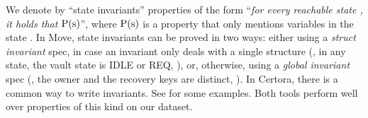  
 We denote by ``state invariants'' properties of the form ``\emph{for every reachable state \state, it holds that $\Prop(\state)$}'', where {$\Prop(\state)$} is a property that only mentions variables in the state \state. 
In Move,  state invariants can be proved in two ways: either using a \emph{struct invariant} spec, in case an invariant only deals with a single structure (\eg, in any state, the vault state is IDLE or REQ, \ie {}), or, otherwise, using a \emph{global invariant} spec (\eg, the owner and the recovery keys are distinct, \ie {}).
In Certora, %
there is a common way to write invariants. See   for some examples.
Both tools perform well over properties of this kind on our dataset.


